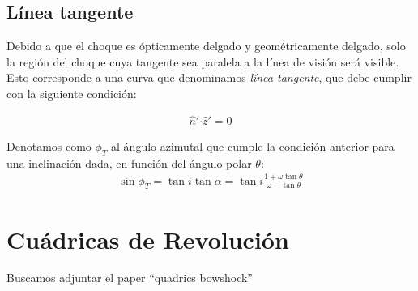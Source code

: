 \subsection{Línea tangente}

Debido a que el choque es \'opticamente delgado y geom\'etricamente
delgado, solo la regi\'on del choque cuya tangente sea paralela a la
l\'inea de visi\'on ser\'a visible. Esto corresponde a una curva que
denominamos \textit{l\'inea tangente}, que debe cumplir con la siguiente
condición:

\begin{align}
  \hat{n}'\boldsymbol{\cdot} \hat{z}' = 0
\end{align}

Denotamos como $\phi_T$ al ángulo azimutal que cumple la condición anterior
para una inclinación dada, en función del ángulo polar $\theta$:
\begin{align}
  \sin\phi_T = \tan i\tan\alpha = \tan i\frac{1+\omega\tan\theta}{\omega-\tan\theta}
\end{align}


\section{Cuádricas de Revolución}

Buscamos adjuntar el paper ``quadrics bowshock''
